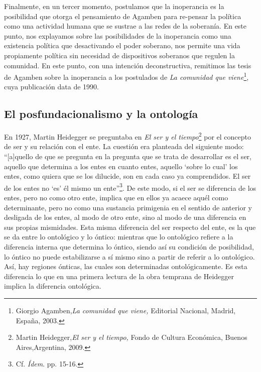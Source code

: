 Finalmente, en un tercer momento, postulamos que la inoperancia es la posibilidad que otorga el pensamiento de Agamben para re-pensar la política como una actividad humana que se sustrae a las redes de la soberanía. En este punto, nos explayamos sobre las posibilidades de la inoperancia como una existencia política que desactivando el poder soberano, nos permite una vida propiamente política sin necesidad de dispositivos soberanos que regulen la comunidad. En este punto, con una intención deconstructiva, remitimos las tesis de Agamben sobre la inoperancia a los postulados de \emph{La comunidad que viene}\footnote{Giorgio Agamben,\emph{La comunidad que viene,} Editorial Nacional, Madrid, España, 2003.}, cuya publicación data de 1990.

\subsection{El posfundacionalismo y la ontología}

En 1927, Martin Heidegger se preguntaba en \emph{El ser y el tiempo}\footnote{Martin Heidegger,\emph{El ser y el tiempo,} Fondo de Cultura Económica, Buenos Aires,Argentina, 2009.} por el concepto de ser y su relación con el ente. La cuestión era planteada del siguiente modo: \enquote{{[}a{]}quello de que se pregunta en la pregunta que se trata de desarrollar es el ser, aquello que determina a los entes en cuanto entes, aquello \enquote{sobre lo cual} los entes, como quiera que se los dilucide, son en cada caso ya comprendidos. El ser de los entes no \enquote{es} él mismo un ente}\footnote{Cf. \emph{Ídem}. pp. 15-16.}. De este modo, si el ser se diferencia de los entes, pero no como otro ente, implica que en ellos ya acaece aquél como determinante, pero no como una sustancia primigenia en el sentido de anterior y desligada de los entes, al modo de otro ente, sino al modo de una diferencia en sus propias mismidades. Esta misma diferencia del ser respecto del ente, es la que se da entre lo ontológico y lo óntico: mientras que lo ontológico refiere a la diferencia interna que determina lo óntico, siendo así su condición de posibilidad, lo óntico no puede estabilizarse a sí mismo sino a partir de referir a lo ontológico. Así, hay regiones ónticas, las cuales son determinadas ontológicamente. Es esta diferencia lo que en una primera lectura de la obra temprana de Heidegger implica la diferencia ontológica.

